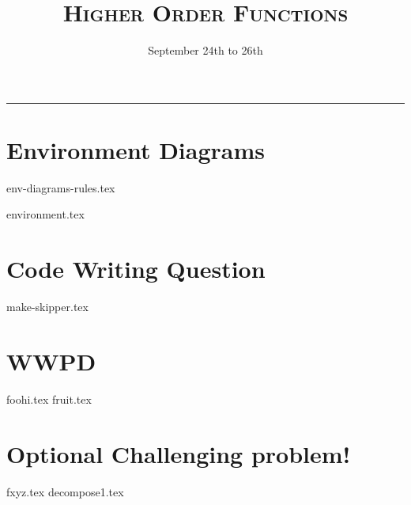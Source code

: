 \documentclass{exam}
\title{\textsc{Higher Order Functions}}
\date{September 24th to 26th}
\begin{document}
\maketitle
\rule{\textwidth}{0.15em}
\fontsize{12}{15}\selectfont



\vspace{-2em}
\section{Environment Diagrams}
{env-diagrams-rules.tex}
\newpage
\begin{questions}
{environment.tex}



\end{questions}


\newpage
\section{Code Writing Question}
\begin{questions}
{make-skipper.tex}

\newpage
\section{WWPD}
\begin{questions}
{foohi.tex}
\newpage
{fruit.tex}
\end{questions}

\newpage
\section{Optional Challenging problem!}
{fxyz.tex}
{decompose1.tex}

\end{questions}
\end{document}

